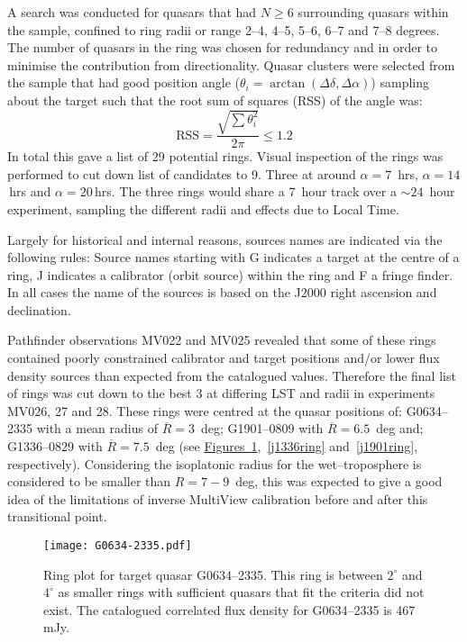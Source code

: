 		A search was conducted for quasars that had $N\ge6$ surrounding quasars within the sample, confined to ring radii or range 2--4, 4--5, 5--6, 6--7 and 7--8 degrees. The number of quasars in the ring was chosen for redundancy and in order to minimise the contribution from directionality. Quasar clusters were selected from the sample that had good position angle ($\theta_i=\arctan (\Delta\delta,\Delta\alpha)$) sampling about the target such that the root sum of squares (RSS) of the angle was:
		\begin{equation*}
			\text{RSS} = \frac{\sqrt{\sum\theta_i^2}}{2\pi} \le 1.2
		\end{equation*} In total this gave a list of 29 potential rings. Visual inspection of the rings was performed to cut down list of candidates to 9. Three at around $\alpha=7$~hrs, $\alpha=14$\,hrs and $\alpha=20$\,hrs. The three rings would share a 7~hour track over a $\sim24$~hour experiment, sampling the different radii and effects due to Local Time.
		
		Largely for historical and internal reasons, sources names are indicated via the following rules: Source names starting with G indicates a target at the centre of a ring, J indicates a calibrator (orbit source) within the ring and F a fringe finder. In all cases the name of the sources is based on the J2000 right ascension and declination.
		
		Pathfinder observations MV022 and MV025 revealed that some of these rings contained poorly constrained calibrator and target positions and/or lower flux density sources than expected from the catalogued values. Therefore the final list of rings was cut down to the best 3 at differing LST and radii in experiments MV026, 27 and 28. These rings were centred at the quasar positions of: G0634--2335 with a mean radius of $\overline{R}=3$~deg; G1901--0809 with $\overline{R}=6.5$~deg and; G1336--0829 with $\overline{R}=7.5$~deg (see \hyperref[j0634ring]{Figures~\ref*{j0634ring}},~\ref{j1336ring} and~\ref{j1901ring}, respectively). Considering the isoplatonic radius for the wet--troposphere is considered to be smaller than $R=7-9$~deg, this was expected to give a good idea of the limitations of inverse MultiView calibration before and after this transitional point.
		
		\begin{figure}[h]
			\centering
			\texttt{[image: G0634-2335.pdf]} 
			\caption[G0634-2335 Ring Plot]{Ring plot for target quasar G0634--2335. This ring is between $2^\circ$ and $4^\circ$ as smaller rings with sufficient quasars that fit the criteria did not exist. The catalogued correlated flux density for G0634--2335 is 467\,mJy.}
			\label{j0634ring}
		\end{figure}
		
